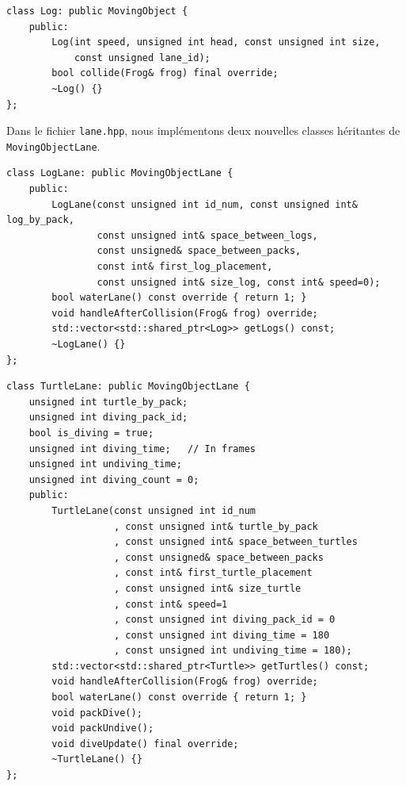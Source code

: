 \documentclass[a4paper, 12pt]{article}
\begin{document}
\begin{lstlisting}
class Log: public MovingObject {
    public:
        Log(int speed, unsigned int head, const unsigned int size,
            const unsigned lane_id);
        bool collide(Frog& frog) final override;
        ~Log() {}
};
\end{lstlisting} \hspace{0.5cm}

Dans le fichier \texttt{lane.hpp}, nous implémentons deux nouvelles classes héritantes de \texttt{MovingObjectLane}.

\begin{lstlisting}
class LogLane: public MovingObjectLane {
    public:
        LogLane(const unsigned int id_num, const unsigned int& log_by_pack,
                const unsigned int& space_between_logs,
                const unsigned& space_between_packs,
                const int& first_log_placement,
                const unsigned int& size_log, const int& speed=0);
        bool waterLane() const override { return 1; }
        void handleAfterCollision(Frog& frog) override;
        std::vector<std::shared_ptr<Log>> getLogs() const;
        ~LogLane() {}
};
\end{lstlisting}

\begin{lstlisting}
class TurtleLane: public MovingObjectLane {
    unsigned int turtle_by_pack;
    unsigned int diving_pack_id;
    bool is_diving = true;
    unsigned int diving_time;   // In frames
    unsigned int undiving_time;
    unsigned int diving_count = 0;
    public:
        TurtleLane(const unsigned int id_num
                   , const unsigned int& turtle_by_pack
                   , const unsigned int& space_between_turtles
                   , const unsigned& space_between_packs
                   , const int& first_turtle_placement
                   , const unsigned int& size_turtle
                   , const int& speed=1
                   , const unsigned int diving_pack_id = 0
                   , const unsigned int diving_time = 180
                   , const unsigned int undiving_time = 180);
        std::vector<std::shared_ptr<Turtle>> getTurtles() const;
        void handleAfterCollision(Frog& frog) override;
        bool waterLane() const override { return 1; }
        void packDive();
        void packUndive();
        void diveUpdate() final override;
        ~TurtleLane() {}
};
\end{lstlisting} \hspace{0.5cm}
\end{document}
